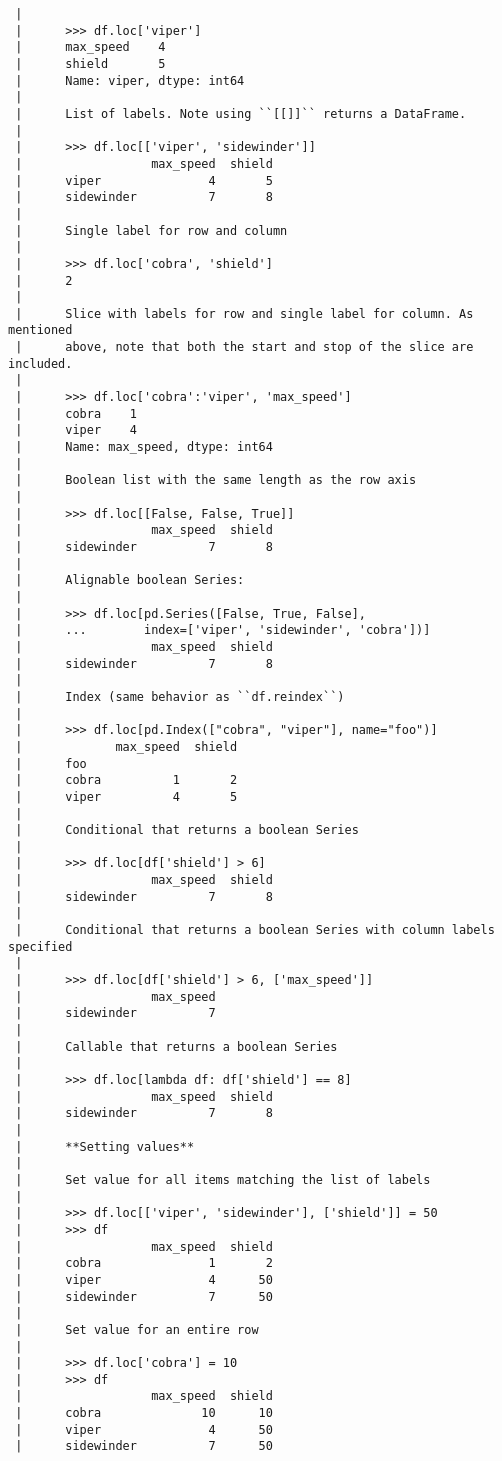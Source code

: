\documentclass[
  letterpaper,
  DIV=11,
  numbers=noendperiod]{scrreprt}
\begin{document}
\begin{verbatim}
 |      
 |      >>> df.loc['viper']
 |      max_speed    4
 |      shield       5
 |      Name: viper, dtype: int64
 |      
 |      List of labels. Note using ``[[]]`` returns a DataFrame.
 |      
 |      >>> df.loc[['viper', 'sidewinder']]
 |                  max_speed  shield
 |      viper               4       5
 |      sidewinder          7       8
 |      
 |      Single label for row and column
 |      
 |      >>> df.loc['cobra', 'shield']
 |      2
 |      
 |      Slice with labels for row and single label for column. As mentioned
 |      above, note that both the start and stop of the slice are included.
 |      
 |      >>> df.loc['cobra':'viper', 'max_speed']
 |      cobra    1
 |      viper    4
 |      Name: max_speed, dtype: int64
 |      
 |      Boolean list with the same length as the row axis
 |      
 |      >>> df.loc[[False, False, True]]
 |                  max_speed  shield
 |      sidewinder          7       8
 |      
 |      Alignable boolean Series:
 |      
 |      >>> df.loc[pd.Series([False, True, False],
 |      ...        index=['viper', 'sidewinder', 'cobra'])]
 |                  max_speed  shield
 |      sidewinder          7       8
 |      
 |      Index (same behavior as ``df.reindex``)
 |      
 |      >>> df.loc[pd.Index(["cobra", "viper"], name="foo")]
 |             max_speed  shield
 |      foo
 |      cobra          1       2
 |      viper          4       5
 |      
 |      Conditional that returns a boolean Series
 |      
 |      >>> df.loc[df['shield'] > 6]
 |                  max_speed  shield
 |      sidewinder          7       8
 |      
 |      Conditional that returns a boolean Series with column labels specified
 |      
 |      >>> df.loc[df['shield'] > 6, ['max_speed']]
 |                  max_speed
 |      sidewinder          7
 |      
 |      Callable that returns a boolean Series
 |      
 |      >>> df.loc[lambda df: df['shield'] == 8]
 |                  max_speed  shield
 |      sidewinder          7       8
 |      
 |      **Setting values**
 |      
 |      Set value for all items matching the list of labels
 |      
 |      >>> df.loc[['viper', 'sidewinder'], ['shield']] = 50
 |      >>> df
 |                  max_speed  shield
 |      cobra               1       2
 |      viper               4      50
 |      sidewinder          7      50
 |      
 |      Set value for an entire row
 |      
 |      >>> df.loc['cobra'] = 10
 |      >>> df
 |                  max_speed  shield
 |      cobra              10      10
 |      viper               4      50
 |      sidewinder          7      50

\end{verbatim}
\end{document}
